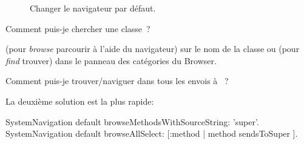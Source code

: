 \documentclass[a4paper,10pt,twoside]{book}
\begin{document}
\begin{figure}[tbh]
	\centering
	\hfill
	\hfill
	\caption{Changer le navigateur par défaut.}
\end{figure}

\begin{faq}
Comment puis-je chercher une classe~?
\end{faq}
\answer
 (pour \emph{browse} \cad parcourir à l'aide du navigateur)
sur le nom de la classe ou  (pour \emph{find} \cad trouver)
dans le panneau des catégories du Browser. %

\begin{faq}
Comment puis-je trouver/naviguer dans tous les envois à \super~?
\end{faq}
\answer
La deuxième solution est la plus rapide:
\begin{code}{}
SystemNavigation default browseMethodsWithSourceString: 'super'.
SystemNavigation default browseAllSelect: [:method | method sendsToSuper ].
\end{code}
\end{document}

